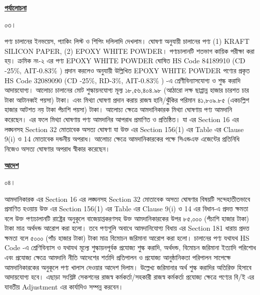 \documentclass[12pt]{article}
\begin{document}
\begin{center}
\textbf{\underline{পর্যালোচনা}}
\end{center}
\begin{minipage}[t]{0.05\linewidth}
০৩।
\end{minipage}
\begin{minipage}[t]{0.95\linewidth}
পণ্য চালানের ইনভয়েস, প্যাকিং লিস্ট ও
শিপিং দলিলাদি দেখলাম।
ঘোষণা অনুযায়ী চালানের পণ্য
(1) KRAFT SILICON PAPER,
(2) EPOXY WHITE POWDER।
পণ্যচালানটি শতভাগ কায়িক পরীক্ষা করা হয়।
ক্রমিক নং-২ এর পণ্য
EPOXY WHITE POWDER
ঘোষিত HS Code 84189910
(CD -25\%, AIT-0.83\% )
প্রদান করলেও
{\fsen}
অনুযায়ী উল্লিখিত
EPOXY WHITE POWDER
পণ্যের প্রকৃত HS Code 32089090
(CD -25\%, RD-3\%, AIT-0.83\% ) -এ
শ্রেণীবিন্যাসযোগ্য ও শুল্ক করাদি আদায়যোগ্য।
আলোচ্য চালানের মোট
শুল্কায়নযোগ্য মূল্য
১৮,৫৬,৪০৪.৯৮ (আঠারো লক্ষ ছাপ্পান্ন হাজার চারশত চার টাকা আটানব্বই পয়সা) টাকা।
এবং মিথ্যা ঘোষণা প্রদান করায় রাজস্ব হানি/ঝুঁকির পরিমান
৪১,৮০৯.৮৫
(একচল্লিশ হাজার আটশত নয় টাকা পঁচাশি পয়সা) টাকা।
আলোচ্য ক্ষেত্রে আমদানিকারক মিথ্যা ঘোষণায়
পণ্য আমদানি করেছেন।
এর ফলে মিথ্যা ঘোষণায় পণ্য আমদানির আপরাধ
প্রমাণিত ও প্রতিষ্ঠিত।
যা {\tca} এর Section 16 এর
লঙ্ঘনসহ Section 32 মোতাবেক
অসত্য ঘোষণা যা উক্ত {\tca}
এর Section 156(1) এর Table এর
Clause 9(i) ও 14 মোতাবেক দন্ডনীয় অপরাধ।
আলোচ্য ক্ষেত্রে আমদানিকারকের পক্ষে সিএন্ডএফ
এজেন্টের প্রতিনিধি নিজেও অসত্য ঘোষণার অপরাধ
স্বীকার করেছেন।
\end{minipage}
\begin{center}
\textbf{\underline{আদেশ}}
\end{center}
\begin{minipage}[t]{0.05\linewidth}
০৪।
\end{minipage}
\begin{minipage}[t]{0.95\linewidth}
আমদানিকারক {\tca} এর Section 16
এর লঙ্ঘনসহ Section 32 মোতাবেক
অসত্য ঘোষণার বিষয়টি সন্দেহাতীতভাবে প্রমাণিত
হওয়ায় উক্ত {\tca} এর Section 156(1) এর
Table এর Clause 9(i) ও 14 এর বিধান-এ প্রদত্ত
ক্ষমতা বলে উক্ত পণ্যচালানটি
রাষ্ট্রের অনুকূলে বাজেয়াপ্তকরণসহ উক্ত আমদানিকারকের
উপর
৮৫,০০০ (পঁচাশি হাজার টাকা) টাকা
মাত্র অর্থদন্ড আরোপ করা হলো। তবে পণ্যগুলি অবাধে আমদানিযোগ্য
বিধায় {\tca} এর Section 181 ধারায় প্রদত্ত ক্ষমতা
বলে
৫০০০ (পাঁচ হাজার টাকা) টাকা মাত্র
বিমোচন জরিমানা আরোপ করা হলো।
চালানের পণ্য যথাযথ HS Code -এ শ্রেণিবিন্যাস ও যথাযথ
মূল্যে শুল্কায়নপূর্বক প্রযোজ্য শুল্ক করাদি, অর্থদন্ড, বিমোচন জরিমানা
ইত্যাদি পরিশোধ এবং প্রযোজ্য ক্ষেত্রে আমদানি নীতি আদেশের
শর্তাদি প্রতিপালন ও প্রযোজ্য আনুষ্ঠানিকতা পরিপালন সাপেক্ষে
আমদানিকারকের অনুকূলে পণ্য খালাস দেওয়ার আদেশ দিলাম।
উল্লেখ্য জরিমানার অর্থ শুল্ক করাদির অতিরিক্ত হিসাবে আদায়যোগ্য
হবে। এছাড়া সংশ্লিষ্ট সেকশনের রাজস্ব কর্মকর্তা/সহকারী রাজস্ব কর্মকর্তা
প্রযোজ্য ক্ষেত্রে পণ্যের বি/ই এর যাবতীয় Adjustment এর কার্যাদিও সম্পন্ন করবেন।
\\
\\
\\
\\
\\
\end{minipage}
\end{document}
